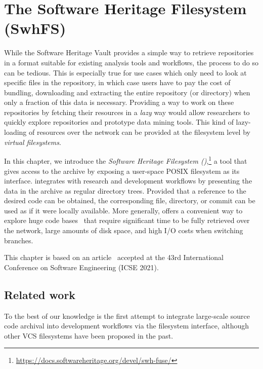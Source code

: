 \chapter{The Software Heritage Filesystem (SwhFS)}%
\label{chp:fuse}

While the Software Heritage Vault provides a simple way to retrieve
repositories in a format suitable for existing analysis tools and workflows,
the process to do so can be tedious. This is especially true for use cases
which only need to look at specific files in the repository, in which case
users have to pay the cost of bundling, downloading and extracting the entire
repository (or directory) when only a fraction of this data is necessary.
Providing a way to work on these repositories by fetching their resources in a
\emph{lazy} way would allow researchers to quickly explore repositories and
prototype data mining tools. This kind of lazy-loading of resources over the
network can be provided at the filesystem level by \emph{virtual filesystems}.

In this chapter, we introduce the \emph{Software Heritage Filesystem
(\SWHFS)},\footnote{\url{https://docs.softwareheritage.org/devel/swh-fuse/}}
a tool that gives access to the \SWH{} archive by exposing a user-space POSIX
filesystem as its interface.
\SWHFS{} integrates with research and development workflows by
presenting the data in the archive as regular directory trees.
Provided that a reference to the desired code can be obtained, the
corresponding file, directory, or commit can be used as if it were locally
available. More generally, \SWHFS{} offers a convenient way to explore huge
code bases~\cite{msscalar, msvfsforgit} that require significant time to be
fully retrieved over the network, large amounts of disk space, and high I/O
costs when switching branches.

\vspace{0.5cm}

This chapter is based on an article~\cite{swh-2021-swhfs}
accepted at the 43rd International Conference on Software Engineering (ICSE
2021).

\section{Related work}

To the best of our knowledge \SWHFS{} is the first attempt to integrate
large-scale source code archival into development workflows via the filesystem
interface, although other VCS filesystems have been proposed in the past.

